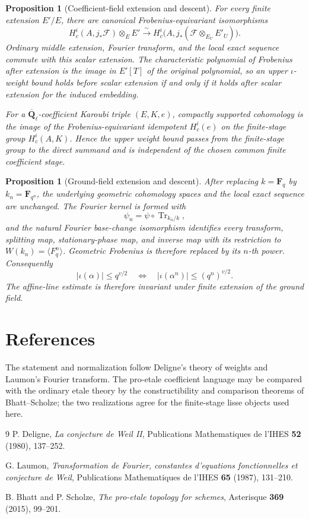 \documentclass[10pt]{article}
\newtheorem{proposition}[theorem]{Proposition}
\theoremstyle{definition}
\newcommand{\Fq}{\mathbf F_q}
\newcommand{\Qlb}{\overline{\mathbf Q}_\ell}
\begin{document}
\begin{proposition}[Coefficient-field extension and descent]
For every finite extension \(E'/E\), there are canonical
Frobenius-equivariant isomorphisms
\[
 H_c^i(A,j_*\mathcal F)\otimes_EE'
 \xrightarrow{\sim}
 H_c^i\bigl(A,j_*(\mathcal F\otimes_{E_U}E'_U)\bigr).
\]
Ordinary middle extension, Fourier transform, and the local exact sequence
commute with this scalar extension.  The characteristic polynomial of
Frobenius after extension is the image in \(E'[T]\) of the original
polynomial, so an upper \(\iota\)-weight bound holds before scalar extension
if and only if it holds after scalar extension for the induced embedding.

For a \(\Qlb\)-coefficient Karoubi triple \((E,K,e)\), compactly supported
cohomology is the image of the Frobenius-equivariant idempotent
\(H_c^i(e)\) on the finite-stage group \(H_c^i(A,K)\).  Hence the upper
weight bound passes from the finite-stage group to the direct summand and
is independent of the chosen common finite coefficient stage.
\end{proposition}

\begin{proposition}[Ground-field extension and descent]
After replacing \(k=\Fq\) by \(k_n=\mathbf F_{q^n}\), the underlying
geometric cohomology spaces and the local exact sequence are unchanged.  The
Fourier kernel is formed with
\[
 \psi_n=\psi\circ\operatorname{Tr}_{k_n/k},
\]
and the natural Fourier base-change isomorphism identifies every transform,
splitting map, stationary-phase map, and inverse map with its restriction to
\(W(k_n)=\langle F_q^n\rangle\).  Geometric Frobenius is therefore replaced
by its \(n\)-th power.  Consequently
\[
  |\iota(\alpha)|\le q^{v/2}
  \quad\Longleftrightarrow\quad
  |\iota(\alpha^n)|\le(q^n)^{v/2}.
\]
The affine-line estimate is therefore invariant under finite extension of
the ground field.
\end{proposition}

\section{References}

The statement and normalization follow Deligne's theory of weights and
Laumon's Fourier transform.  The pro-etale coefficient language may be
compared with the ordinary etale theory by the constructibility and
comparison theorems of Bhatt--Scholze; the two realizations agree for the
finite-stage lisse objects used here.

\begin{thebibliography}{9}
P. Deligne, \emph{La conjecture de Weil II},
Publications Mathematiques de l'IHES \textbf{52} (1980), 137--252.

G. Laumon, \emph{Transformation de Fourier, constantes d'equations
fonctionnelles et conjecture de Weil},
Publications Mathematiques de l'IHES \textbf{65} (1987), 131--210.

B. Bhatt and P. Scholze, \emph{The pro-etale topology for schemes},
Asterisque \textbf{369} (2015), 99--201.
\end{thebibliography}
\end{document}
